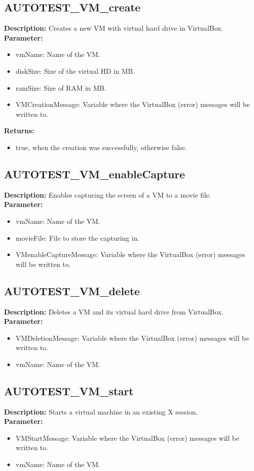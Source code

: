 \subsection{AUTOTEST\_VM\_create}
\textbf{Description:} Creates a new VM with virtual hard drive in VirtualBox.\\
\textbf{Parameter:}
\begin{itemize}
\item vmName: Name of the VM.
\item diskSize: Size of the virtual HD in MB.
\item ramSize: Size of RAM in MB.
\item VMCreationMessage: Variable where the VirtualBox (error) messages will be written to.
\end{itemize}
\textbf{Returns:}
\begin{itemize}
\item true, when the creation was successfully, otherwise false.
\end{itemize}

\subsection{AUTOTEST\_VM\_enableCapture}
\textbf{Description:} Enables capturing the screen of a VM to a movie file.\\
\textbf{Parameter:}
\begin{itemize}
\item vmName: Name of the VM.
\item movieFile: File to store the capturing in.
\item VMenableCaptureMessage: Variable where the VirtualBox (error) messages will be written to.
\end{itemize}

\subsection{AUTOTEST\_VM\_delete}
\textbf{Description:} Deletes a VM and its virtual hard drive from VirtualBox.\\
\textbf{Parameter:}
\begin{itemize}
\item VMDeletionMessage: Variable where the VirtualBox (error) messages will be written to.
\item vmName: Name of the VM.
\end{itemize}

\subsection{AUTOTEST\_VM\_start}
\textbf{Description:} Starts a virtual machine in an existing X session.\\
\textbf{Parameter:}
\begin{itemize}
\item VMStartMessage: Variable where the VirtualBox (error) messages will be written to.
\item vmName: Name of the VM.
\end{itemize}

